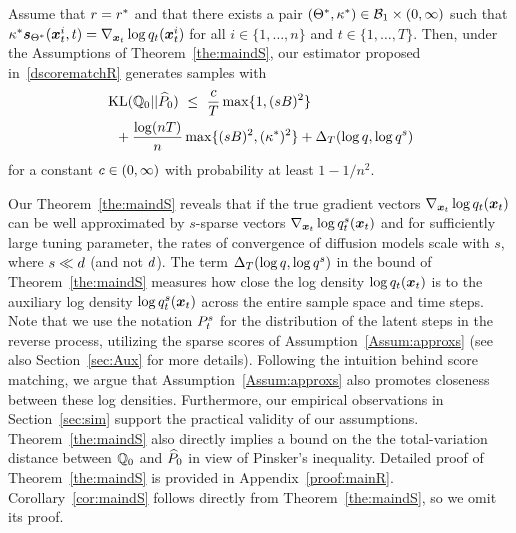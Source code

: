 \begin{corollary}
\label{cor:maindS}
Assume that $\textcolor{black}{r}=\textcolor{black}{r^*}$ and that there exists a pair $(\Theta^*,\kappa^*)\in \textcolor{black}{\mathcal{B}_1} \times (0,\infty)$ such that $\kappa^*\textcolor{black}{\textcolor{black}{\boldsymbol{s}}_{\textcolor{black}{\textcolor{black}{\Theta}^*}}}(\textcolor{black}{\boldsymbol{x}}_t^i,t)=\nabla_{\textcolor{black}{\boldsymbol{x}}_t}\log q_t(\textcolor{black}{\boldsymbol{x}}_t^i)$ for all $i\in\{1,\dots,n\}$ and $t\in \{1,\dots,T\}$. Then, under the Assumptions of Theorem~\ref{the:maindS}, our estimator proposed in~\eqref{dscorematchR}  generates samples with
    \begin{align*}
     &\operatorname{KL}(\mathbb{Q}_0 ||\widehat{P}_0)
     ~\le~\frac{c}{T}\max\{1,(sB)^2\}\\
     &~~+ \frac{\log (nT)}{n}\max\{(sB)^2,(\kappa^*)^2\}
      +\Delta_{T} (\log q,\log q^s)
\end{align*}
for a constant $c\in (0,\infty)$  with probability at least $1-1/n^2$.
\end{corollary}
Our Theorem~\ref{the:maindS} reveals that if the true gradient vectors $\nabla_{\textcolor{black}{\boldsymbol{x}}_t} \log q_t(\textcolor{black}{\boldsymbol{x}}_t)$ can be well approximated by $s$-sparse vectors $\nabla_{\textcolor{black}{\boldsymbol{x}}_t}\log q^s_t(\textcolor{black}{\boldsymbol{x}}_t)$ and for sufficiently large tuning parameter, the rates of convergence of diffusion models scale with $s$, where $s \ll \textcolor{black}{d}$ (and not $\textcolor{black}{d}$).  
The term $\Delta_{T}(\log q,\log q^s)$ in the bound of Theorem~\ref{the:maindS} measures how close the log density  $\log q_t(\textcolor{black}{\boldsymbol{x}}_t)$ is to the auxiliary log density $\log q^s_t(\textcolor{black}{\boldsymbol{x}}_t)$ across the entire sample space and time steps.  
Note that we use the notation $P^s_t$ for the distribution of the latent steps in the reverse process, utilizing the sparse scores of Assumption~\ref{Assum:approxs} (see also Section~\ref{sec:Aux} for more details). 
Following the intuition behind score matching, we argue that Assumption~\ref{Assum:approxs} also promotes closeness between these log densities.
Furthermore, our empirical observations in Section~\ref{sec:sim} support the practical validity of our assumptions.
Theorem~\ref{the:maindS}  also directly implies a bound on the the total-variation distance between $\mathbb{Q}_0$ and $\widehat{P}_0$ in view of Pinsker's inequality.
Detailed proof of Theorem~\ref{the:maindS} is provided in Appendix~\ref{proof:mainR}. 
Corollary~\ref{cor:maindS} follows directly from Theorem~\ref{the:maindS}, so we omit its proof.

